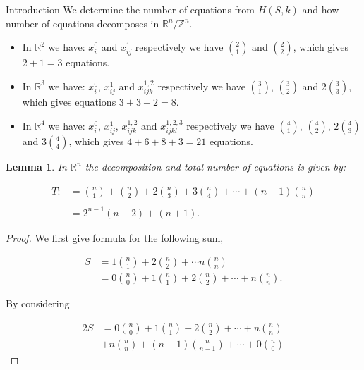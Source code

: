 \documentclass[a4paper,12pt]{article}
\newtheorem{lemma}[theorem]{Lemma}
\theoremstyle{definition}
\theoremstyle{indented}
\begin{document}
\begin{section}{Introduction}
We determine the number of equations from $H(S,k)$ and how number of equations decomposes in $\mathbb{R}^n/\mathbb{Z}^n$.

\begin{itemize}

 \item In $\mathbb{R}^2$ we have: $x_{i}^{0}$ and $x_{ij}^1$ respectively we have ${2 \choose 1}$ and ${2 \choose 2}$, which gives $2+1=3$ equations.

    \item In $\mathbb{R}^3$ we have: $x_{i}^{0}$, $x_{ij}^1$  and $x_{ijk}^{1,2}$ respectively we have ${3 \choose 1}$, ${3 \choose 2}$ and $2{3 \choose 3}$, which gives equations $3+3+2=8$.


  
    \item In $\mathbb{R}^4$ we have: $x_{i}^{0}$, $x_{ij}^1$, $x_{ijk}^{1,2}$ and $x_{ijkl}^{1,2,3}$ respectively we have ${4 \choose 1}$, ${4 \choose 2}$, $2{4 \choose 3}$ and $3{4 \choose 4}$, which gives $4+6+8+3=21$ equations.
     
 
\end{itemize}

\begin{lemma} In $\mathbb{R}^n$ the decomposition and total number of equations is given by:

\begin{align*}
    T:&= {n \choose 1}+ {n \choose 2} + 2 {n \choose 3} + 3{ n \choose 4} + \cdots + (n-1){ n \choose n}\\
    \\
    &=2^{n-1}(n-2)+(n+1).
\end{align*}

\end{lemma}

\begin{proof}

We first give formula for the following sum, 

\begin{align*}
    S&=1 {n \choose 1} + 2 {n \choose 2}  + \cdots n  {n \choose n}\\
    &=0 {n \choose 0} + 1 {n \choose 1} + 2 {n \choose 2}  + \cdots + n  {n \choose n}.
\end{align*}

By considering

\begin{align*}
    2S&= 0 {n \choose 0} + 1 {n \choose 1} + 2 {n \choose 2}  + \cdots + n  {n \choose n} \\
    &+ n  {n \choose n} + (n-1) {n \choose {n-1}} + \cdots + 0 {n \choose 0}
\end{align*}


\end{proof}
\end{section}
\end{document}
